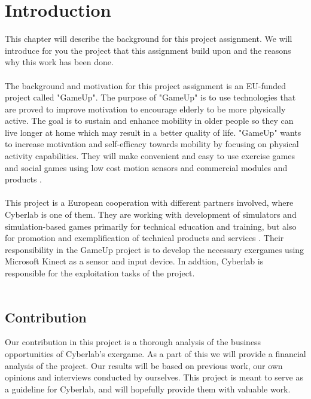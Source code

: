 \chapter{Introduction}
This chapter will describe the background for this project assignment. We will introduce for you the project that this assignment build upon and the reasons why this work has been done. \\ \\
The background and motivation for this project assignment is an EU-funded project called "GameUp". The purpose of "GameUp" is to use technologies that are proved to improve motivation to encourage elderly to be more physically active. The goal is to sustain and enhance mobility in older people so they can live longer at home which may result in a better quality of life. "GameUp" wants to increase motivation and self-efficacy towards mobility by focusing on physical activity capabilities. They will make convenient and easy to use exercise games and social games using low cost motion sensors and commercial modules and products \cite{gameup}.\\ \\ This project is a European cooperation with different partners involved, where Cyberlab is one of them. They are working with development of simulators and simulation-based games primarily for technical education and training, but also for promotion and exemplification of technical products and services \cite{cyberlab}. Their responsibility in the GameUp project is to develop the necessary exergames using Microsoft Kinect as a sensor and input device. In addtion, Cyberlab is responsible for the exploitation tasks of the project.  \\ \\

\section{Contribution}
Our contribution in this project is a thorough analysis of the business opportunities of Cyberlab’s exergame. As a part of this we will provide a financial analysis of the project. Our results will be based on previous work, our own opinions and interviews conducted by ourselves. This project is meant to serve as a guideline for Cyberlab, and will hopefully provide them with valuable work.  

